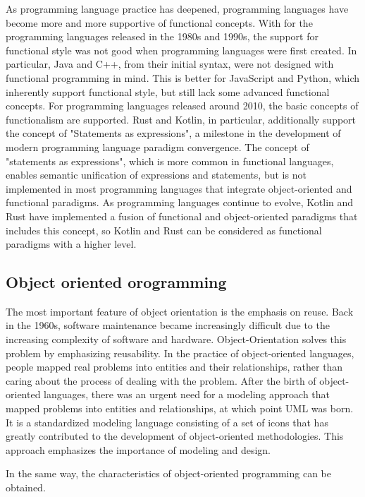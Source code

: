 As programming language practice has deepened, programming languages have become more and more supportive of functional concepts. With for the programming languages released in the 1980s and 1990s, the support for functional style was not good when programming languages were first created. In particular, Java and C++, from their initial syntax, were not designed with functional programming in mind. This is better for JavaScript and Python, which inherently support functional style, but still lack some advanced functional concepts. For programming languages released around 2010, the basic concepts of functionalism are supported. Rust and Kotlin, in particular, additionally support the concept of "Statements as expressions", a milestone in the development of modern programming language paradigm convergence. The concept of "statements as expressions", which is more common in functional languages, enables semantic unification of expressions and statements, but is not implemented in most programming languages that integrate object-oriented and functional paradigms. As programming languages continue to evolve, Kotlin and Rust have implemented a fusion of functional and object-oriented paradigms that includes this concept, so Kotlin and Rust can be considered as functional paradigms with a higher level.

\subsection{Object oriented orogramming}

The most important feature of object orientation is the emphasis on reuse. Back in the 1960s, software maintenance became increasingly difficult due to the increasing complexity of software and hardware. Object-Orientation solves this problem by emphasizing reusability. In the practice of object-oriented languages, people mapped real problems into entities and their relationships, rather than caring about the process of dealing with the problem. After the birth of object-oriented languages, there was an urgent need for a modeling approach that mapped problems into entities and relationships, at which point UML was born. It is a standardized modeling language consisting of a set of icons that has greatly contributed to the development of object-oriented methodologies. This approach emphasizes the importance of modeling and design.


In the same way, the characteristics of object-oriented programming can be obtained.

